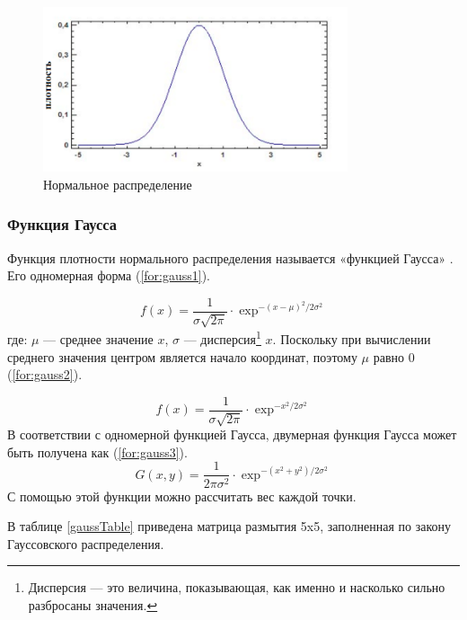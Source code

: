 \begin{figure}[hbtp]
	\centering
	\includegraphics[width=0.8\textwidth]{img/image6.png}
	\caption{\label{fig:spire13} Нормальное распределение}
\end{figure}

\subsubsection{Функция Гаусса}

Функция плотности нормального распределения называется «функцией Гаусса» \cite{gauss}. Его одномерная форма (\ref{for:gauss1}).

\begin{equation}
	\label{for:gauss1}
	f(x) = \frac{1}{\sigma\sqrt{2\pi}} \cdot \exp^{-(x-\mu)^2/2\sigma^2}
\end{equation}
где: \(\mu\) — среднее значение \(x\), \(\sigma\) — дисперсия\footnote{Дисперсия — это величина, показывающая, как именно и насколько сильно разбросаны значения.}  \(x\). Поскольку при вычислении среднего значения центром является начало координат, поэтому \(\mu\) равно 0 (\ref{for:gauss2}).

\begin{equation}
	\label{for:gauss2}
	f(x) = \frac{1}{\sigma\sqrt{2\pi}} \cdot \exp^{-x^2/2\sigma^2}
\end{equation}
В соответствии с одномерной функцией Гаусса, двумерная функция Гаусса может быть получена как (\ref{for:gauss3}).
\begin{equation}
	\label{for:gauss3}
	G(x,y) = \frac{1}{2\pi\sigma^2} \cdot \exp^{-(x^2+y^2)/2\sigma^2}
\end{equation}
С помощью этой функции можно рассчитать вес каждой точки.

В таблице \ref{gaussTable} приведена матрица размытия 5x5, заполненная по закону Гауссовского распределения.

